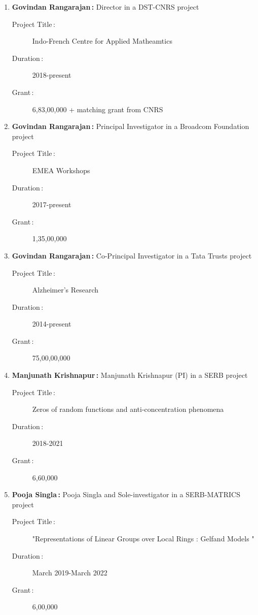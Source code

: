 \begin{enumerate}
\item {\bf Govindan Rangarajan\,:} Director in a DST-CNRS project
\begin{description}
  \item[Project Title\,:] Indo-French Centre for Applied Matheamtics
  \item[Duration\,:] 2018-present
  \item[Grant\,:] 6,83,00,000 + matching grant from CNRS
\end{description}


\item {\bf Govindan Rangarajan\,:} Principal Investigator in a Broadcom Foundation project
\begin{description}
  \item[Project Title\,:] EMEA Workshops
  \item[Duration\,:] 2017-present
  \item[Grant\,:] 1,35,00,000
\end{description}


\item {\bf Govindan Rangarajan\,:} Co-Principal Investigator in a Tata Trusts project
\begin{description}
  \item[Project Title\,:] Alzheimer's Research
  \item[Duration\,:] 2014-present
  \item[Grant\,:] 75,00,00,000
\end{description}


\item {\bf Manjunath Krishnapur\,:} Manjunath Krishnapur (PI) in a SERB project
\begin{description}
  \item[Project Title\,:] Zeros of random functions and anti-concentration phenomena
  \item[Duration\,:] 2018-2021
  \item[Grant\,:] 6,60,000
\end{description}


\item {\bf Pooja Singla\,:} Pooja Singla and Sole-investigator in a SERB-MATRICS project
\begin{description}
  \item[Project Title\,:] "Representations of Linear Groups over Local Rings : Gelfand Models "
  \item[Duration\,:] March 2019-March 2022
  \item[Grant\,:] 6,00,000
\end{description}



\end{enumerate}
